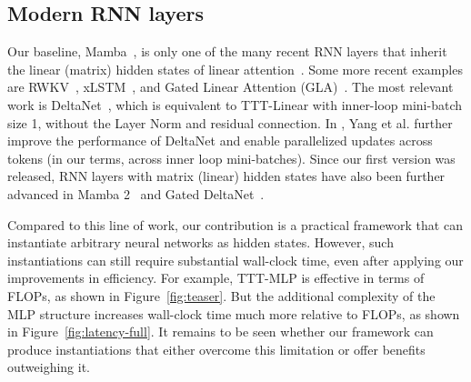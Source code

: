 \documentclass{article}
\begin{document}

\subsection{Modern RNN layers}

Our baseline, Mamba~\cite{gu2023mamba}, is only one of the many recent RNN layers that inherit the  linear (matrix) hidden states of linear attention~\cite{katharopoulos2020transformers, schlag2020learning}.
Some more recent examples are RWKV~\cite{peng2023rwkv, peng2024eagle}, xLSTM~\cite{beck2024xlstm}, and Gated Linear Attention (GLA)~\cite{yang2023gated}.
The most relevant work is DeltaNet~\cite{schlag2021linear}, which is equivalent to TTT-Linear with inner-loop mini-batch size 1, without the Layer Norm and residual connection.
In \cite{yang2024parallelizing}, Yang et al. further improve the performance of DeltaNet and enable parallelized updates across tokens (in our terms, across inner loop mini-batches).
Since our first version was released, RNN layers with matrix (linear) hidden states have also been further advanced in Mamba 2~\cite{dao2024transformers} and Gated DeltaNet~\cite{yang2023gated}.

Compared to this line of work, our contribution is a practical framework that can instantiate arbitrary neural networks as hidden states.
However, such instantiations can still require substantial wall-clock time, even after applying our improvements in efficiency.
For example, TTT-MLP is effective in terms of FLOPs, as shown in Figure~\ref{fig:teaser}. 
But the additional complexity of the MLP structure increases wall-clock time much more relative to FLOPs, as shown in Figure~\ref{fig:latency-full}.
It remains to be seen whether our framework can produce instantiations that either overcome this limitation or offer benefits outweighing it.
\end{document}
